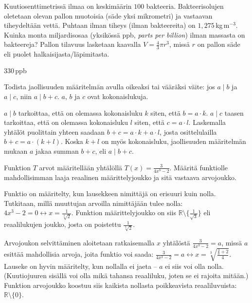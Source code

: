 \begin{multicols}{2}
\begin{tehtava}
Kuutiosenttimetrissä ilmaa on keskimäärin $100$ bakteeria. Bakteerisolujen oletetaan olevan pallon muotoisia (säde yksi mikrometri) ja vastaavan tiheydeltään vettä. Puhtaan ilman tiheys (ilman bakteereita) on $1,275$\,kg\,m$^{-3}$. Kuinka monta miljardisosaa (yksikössä ppb, \textit{parts per billion}) ilman massasta on bakteereja? Pallon tilavuus lasketaan kaavalla $V=\frac{4}{3}\pi r^3$, missä $r$ on pallon säde eli puolet halkaisijasta/läpimitasta.
	\begin{vastaus}
	$330$\,ppb %
	\end{vastaus}
\end{tehtava}	
	
\begin{tehtava}
Todista jaollisuuden määritelmän avulla oikeaksi tai vääräksi väite: jos $a\mid b$ ja $a\mid c$, niin $a\mid b+c$. $a$, $b$ ja $c$ ovat kokonaislukuja.
	\begin{vastaus}
	$a	\mid b$ tarkoittaa, että on olemassa kokonaisluku $k$ siten, että $b=a\cdot k$. $a \mid c$ taasen tarkoittaa, että on olemassa kokonaisluku $l$ siten, että $c=a\cdot l$. Laskemalla yhtälöt puolittain yhteen saadaan $b+c=a\cdot k + a\cdot l$, josta osittelulailla $b+c=a\cdot (k+l)$. Koska $k+l$ on myös kokonaisluku, jaollisuuden määritelmän mukaan $a$ jakaa summan $b+c$, eli $a\mid b+c$.
	\end{vastaus}
\end{tehtava}	
	
\begin{tehtava}
Funktion $T$ arvot määritellään yhtälöllä $T(x)=\frac{3}{4x^3-2}$. Määritä funktiolle mahdollisimman laaja reaalinen määrittelyjoukko ja sitä vastaava arvojoukko.
	\begin{vastaus}
Funktio on määritelty, kun lausekkeen nimittäjä on erisuuri kuin nolla. Tutkitaan, millä muuttujan arvoilla nimittäjään tulee nolla: $4x^3-2=0 \leftrightarrow x=\frac{1}{\sqrt[3]{2}}$. Funktion määrittelyjoukko on siis $\mathbb{R}\setminus\lbrace\frac{1}{\sqrt{3}} \rbrace$ eli reaalilukujen joukko, josta on poistettu $\frac{1}{\sqrt[3]{2}}$.

Arvojoukon selvittäminen aloitetaan ratkaisemalla $x$ yhtälöstä $\frac{3}{4x^3-2}=a$, missä $a$ esittää mahdollisia arvoja, joita funktio voi saada: $\frac{3}{4x^3-2}=a \leftrightarrow x= \sqrt[3]{\frac{\frac{3}{a}+2}{4}}$. Lauseke on hyvin määritelty, kun nollalla ei jaeta -- $a$ ei siis voi olla nolla. (Kuutiojuuren sisällä voi olla mikä tahansa reaaliluku, joten se ei rajoita mitään.) Funktion arvojoukko koostuu siis kaikista nollasta poikkeavista reaaliluvuista: $\mathbb{R}\setminus \lbrace 0 \rbrace$.
	\end{vastaus}
\end{tehtava}

\end{multicols}
\newpage
	
